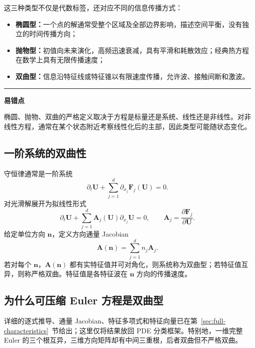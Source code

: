 \documentclass[cn,hazy,blue,11pt,normal]{elegantnote}
\numberwithin{equation}{section}
\newcommand{\vct}[1]{\bm{#1}}
\newcommand{\ten}[1]{\bm{#1}}
\newenvironment{warningbox}{%
  \par\medskip\noindent\color{red!65!black}\rule{0.8em}{0.8em}\quad
  \begin{minipage}{0.91\linewidth}\color{black}\textbf{易错点}\quad
}{\end{minipage}\par\medskip}
\begin{document}
这三种类型不仅是代数标签，还对应不同的信息传播方式：
\begin{itemize}
 \item \textbf{椭圆型：}一个点的解通常受整个区域及全部边界影响，描述空间平衡，没有独立的时间传播方向；
 \item \textbf{抛物型：}初值向未来演化，高频迅速衰减，具有平滑和耗散效应；经典热方程在数学上具有无限传播速度；
 \item \textbf{双曲型：}信息沿特征线或特征锥以有限速度传播，允许波、接触间断和激波。
\end{itemize}

\begin{warningbox}
椭圆、抛物、双曲的严格定义取决于方程是标量还是系统、线性还是非线性。对非线性方程，通常在某个状态附近考察线性化后的主部，因此类型可能随状态变化。
\end{warningbox}

\subsection{一阶系统的双曲性}

守恒律通常是一阶系统
\begin{equation}
 \partial_t\vct U+\sum_{j=1}^d\partial_{x_j}\vct F_j(\vct U)=0.
\end{equation}
对光滑解展开为拟线性形式
\begin{equation}
 \partial_t\vct U+\sum_{j=1}^d\ten A_j(\vct U)\partial_{x_j}\vct U=0,
 \qquad
 \ten A_j=\frac{\partial\vct F_j}{\partial\vct U}.
\end{equation}
给定单位方向 $\vct n$，定义方向通量 Jacobian
\begin{equation}
 \ten A(\vct n)=\sum_{j=1}^dn_j\ten A_j.
\end{equation}
若对每个 $\vct n$，$\ten A(\vct n)$ 都有实特征值并可对角化，则系统称为双曲型；若特征值互异，则称严格双曲。特征值是各特征波在 $\vct n$ 方向的传播速度。

\subsection{为什么可压缩 Euler 方程是双曲型}

详细的逐式推导、通量 Jacobian、特征多项式和特征向量已在第~\ref{sec:full-characteristics}~节给出；这里仅将结果放回 PDE 分类框架。特别地，一维完整 Euler 的三个根互异，三维方向矩阵却有中间三重根，后者双曲但不严格双曲。
\end{document}
